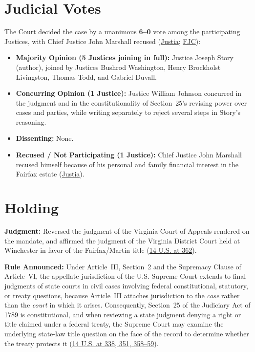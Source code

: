 \documentclass[12pt]{article}
\begin{document}
\section{Judicial Votes}

The Court decided the case by a unanimous \textbf{6--0} vote among the participating Justices, with Chief Justice John Marshall recused (\href{https://supreme.justia.com/cases/federal/us/14/304/}{Justia}; \href{https://www.fjc.gov/history/cases/cases-that-shaped-the-federal-courts/martin-v-hunter-s-lessee}{FJC}):

\begin{itemize}
    \item \textbf{Majority Opinion (5 Justices joining in full):} Justice Joseph Story (author), joined by Justices Bushrod Washington, Henry Brockholst Livingston, Thomas Todd, and Gabriel Duvall.
    \item \textbf{Concurring Opinion (1 Justice):} Justice William Johnson concurred in the judgment and in the constitutionality of Section~25's revising power over cases and parties, while writing separately to reject several steps in Story's reasoning.
    \item \textbf{Dissenting:} None.
    \item \textbf{Recused / Not Participating (1 Justice):} Chief Justice John Marshall recused himself because of his personal and family financial interest in the Fairfax estate (\href{https://supreme.justia.com/cases/federal/us/14/304/}{Justia}).
\end{itemize}

\section{Holding}

\textbf{Judgment:} Reversed the judgment of the Virginia Court of Appeals rendered on the mandate, and affirmed the judgment of the Virginia District Court held at Winchester in favor of the Fairfax/Martin title (\href{https://supreme.justia.com/cases/federal/us/14/304/}{14 U.S. at 362}).

\textbf{Rule Announced:} Under Article~III, Section~2 and the Supremacy Clause of Article~VI, the appellate jurisdiction of the U.S. Supreme Court extends to final judgments of state courts in civil cases involving federal constitutional, statutory, or treaty questions, because Article~III attaches jurisdiction to the \textit{case} rather than the \textit{court} in which it arises. Consequently, Section~25 of the Judiciary Act of 1789 is constitutional, and when reviewing a state judgment denying a right or title claimed under a federal treaty, the Supreme Court may examine the underlying state-law title question on the face of the record to determine whether the treaty protects it (\href{https://supreme.justia.com/cases/federal/us/14/304/}{14 U.S. at 338, 351, 358--59}).
\end{document}

